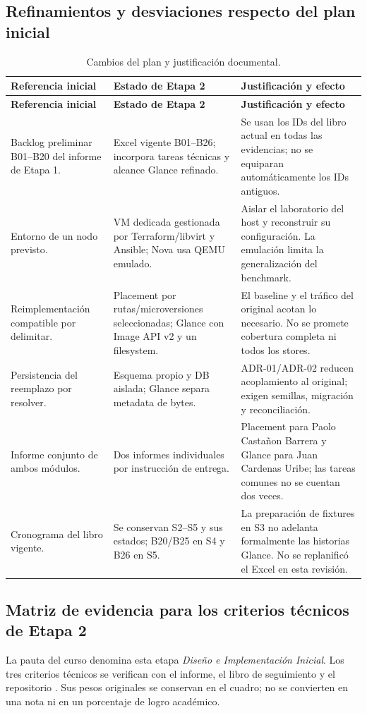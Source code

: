 \documentclass[12pt,a4paper]{article}
\newcommand{\reporttable}[4]{\begingroup\small\setlength{\LTpre}{8pt}\setlength{\LTpost}{8pt}\setlength{\tabcolsep}{4pt}\renewcommand{\arraystretch}{1.15}
\begin{longtable}{#2}\caption{#1}\\\toprule #3\\\midrule\endfirsthead
\toprule #3\\\midrule\endhead\bottomrule\endfoot #4\end{longtable}\endgroup}
\begin{document}
\Needspace{415pt}
\subsection{Refinamientos y desviaciones respecto del plan inicial}

\reporttable{Cambios del plan y justificación documental.}{>{\raggedright\arraybackslash}p{4.1cm}>{\raggedright\arraybackslash}p{5.3cm}>{\raggedright\arraybackslash}p{5.3cm}}{\textbf{Referencia inicial}&\textbf{Estado de Etapa 2}&\textbf{Justificación y efecto}}{
Backlog preliminar B01--B20 del informe de Etapa 1.&Excel vigente B01--B26; incorpora tareas técnicas y alcance Glance refinado.&Se usan los IDs del libro actual en todas las evidencias; no se equiparan automáticamente los IDs antiguos.\\*
Entorno de un nodo previsto.&VM dedicada gestionada por Terraform/libvirt y Ansible; Nova usa QEMU emulado.&Aislar el laboratorio del host y reconstruir su configuración. La emulación limita la generalización del benchmark.\\*
Reimplementación compatible por delimitar.&Placement por rutas/microversiones seleccionadas; Glance con Image API v2 y un filesystem.&El baseline y el tráfico del original acotan lo necesario. No se promete cobertura completa ni todos los stores.\\*
Persistencia del reemplazo por resolver.&Esquema propio y DB aislada; Glance separa metadata de bytes.&ADR-01/ADR-02 reducen acoplamiento al original; exigen semillas, migración y reconciliación.\\*
Informe conjunto de ambos módulos.&Dos informes individuales por instrucción de entrega.&Placement para Paolo Castañon Barrera y Glance para Juan Cardenas Uribe; las tareas comunes no se cuentan dos veces.\\*
Cronograma del libro vigente.&Se conservan S2--S5 y sus estados; B20/B25 en S4 y B26 en S5.&La preparación de fixtures en S3 no adelanta formalmente las historias Glance. No se replanificó el Excel en esta revisión.\\}


\Needspace{365pt}
\subsection{Matriz de evidencia para los criterios técnicos de Etapa 2}
La pauta del curso denomina esta etapa \textit{Diseño e Implementación Inicial}. Los tres criterios técnicos se verifican con el informe, el libro de seguimiento y el repositorio \cite{rubric}. Sus pesos originales se conservan en el cuadro; no se convierten en una nota ni en un porcentaje de logro académico.
\end{document}
